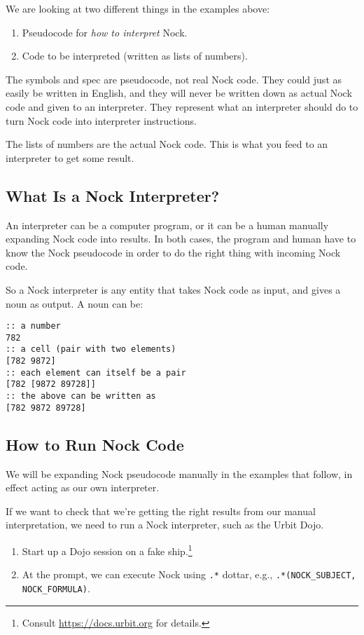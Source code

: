 \documentclass[twoside]{article}
\begin{document}
We are looking at two different things in the examples above:

\begin{enumerate}
  \item  Pseudocode for \emph{how to interpret} Nock.
  \item  Code to be interpreted (written as lists of numbers).
\end{enumerate}

The symbols and spec are pseudocode, not real Nock code. They could just as easily be written in English, and they will never be written down as actual Nock code and given to an interpreter. They represent what an interpreter should do to turn Nock code into interpreter instructions.

The lists of numbers are the actual Nock code. This is what you feed to an interpreter to get some result.

\subsection{What Is a Nock Interpreter?}

An interpreter can be a computer program, or it can be a human manually expanding Nock code into results. In both cases, the program and human have to know the Nock pseudocode in order to do the right thing with incoming Nock code.

So a Nock interpreter is any entity that takes Nock code as input, and gives a noun as output. A noun can be:

\begin{lstlisting}[style=listingblock]
:: a number
782
:: a cell (pair with two elements)
[782 9872]
:: each element can itself be a pair
[782 [9872 89728]]
:: the above can be written as
[782 9872 89728]
\end{lstlisting}

\subsection{How to Run Nock Code}

We will be expanding Nock pseudocode manually in the examples that follow, in effect acting as our own interpreter.

If we want to check that we're getting the right results from our manual interpretation, we need to run a Nock interpreter, such as the Urbit Dojo.

\begin{enumerate}
  \item  Start up a Dojo session on a fake ship.\footnote{Consult \url{https://docs.urbit.org} for details.}
  \item  At the prompt, we can execute Nock using \texttt{.*} dottar, e.g., \lstinline[style=inlinecode]{.*(NOCK_SUBJECT, NOCK_FORMULA)}.
\end{enumerate}
\end{document}
